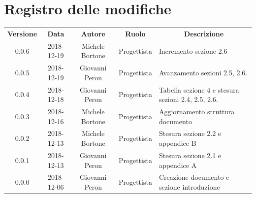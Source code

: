 \documentclass[11pt,a4paper]{article}
\begin{document}
	
	\newpage
	\section*{\centering Registro delle modifiche}
	\begin{tabularx}{\textwidth}{ c | c | c | c | X }
		\rowcolor{LightBlue}
		\color{white}\bfseries Versione & \color{white}\bfseries Data & \color{white}\bfseries Autore & \color{white}\bfseries Ruolo & \multicolumn{1}{c}{\color{white}\bfseries Descrizione}\\[0.25cm]
		0.0.6 & 2018-12-19 & Michele Bortone & Progettista & Incremento sezione 2.6\\
		0.0.5 & 2018-12-19 & Giovanni Peron & Progettista & Avanzamento sezioni 2.5, 2.6.\\
		0.0.4 & 2018-12-18 & Giovanni Peron & Progettista & Tabella sezione 4 e stesura sezioni 2.4, 2.5, 2.6.\\
		0.0.3 & 2018-12-16 & Michele Bortone & Progettista & Aggiornamento struttura documento\\
		0.0.2 & 2018-12-13 & Michele Bortone & Progettista & Stesura sezione 2.2  e appendice B\\
		0.0.1 & 2018-12-13 & Giovanni Peron & Progettista & Stesura sezione 2.1 e appendice A \\
		0.0.0 & 2018-12-06 & Giovanni Peron & Progettista & Creazione documento e
sezione introduzione \\
	\end{tabularx}
	\newpage
	\tableofcontents
	\newpage
		
	\newpage
	
	\newpage
	
	\newpage
	
	\newpage
		
\end{document}

